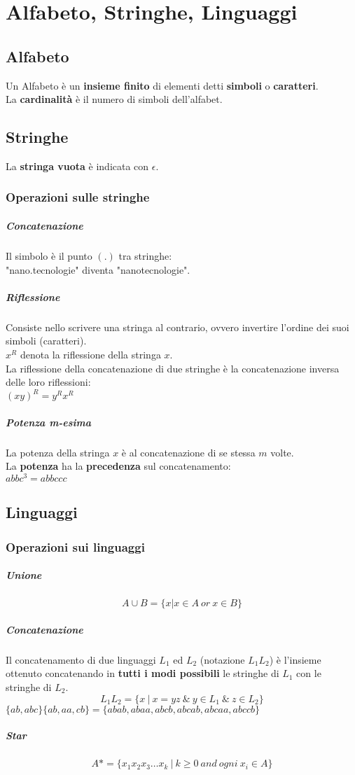 \documentclass[12pt]{extarticle}
\begin{document}
\section{Alfabeto, Stringhe, Linguaggi}
\subsection{Alfabeto}
Un Alfabeto è un \textbf{insieme finito} di elementi detti \textbf{simboli} o \textbf{caratteri}.\\
La \textbf{cardinalità} è il numero di simboli dell'alfabet.
\subsection{Stringhe}
La \textbf{stringa vuota} è indicata con $\epsilon$.
\subsubsection{Operazioni sulle stringhe}
\subparagraph{Concatenazione}
Il simbolo è il punto $(.)$ tra stringhe:\\
"nano.tecnologie" diventa "nanotecnologie".
\subparagraph{Riflessione}
Consiste nello scrivere una stringa al contrario, ovvero invertire l'ordine dei suoi simboli (caratteri).\\
$x^R$ denota la riflessione della stringa $x$.\\
La riflessione della concatenazione di due stringhe è la concatenazione inversa delle loro riflessioni:\\
$(xy)^R=y^Rx^R$
\subparagraph{Potenza m-esima}
La potenza della stringa $x$ è al concatenazione di se stessa $m$ volte.\\
La \textbf{potenza} ha la \textbf{precedenza} sul concatenamento:\\
$abbc^3 = abbccc$
\subsection{Linguaggi}
\subsubsection{Operazioni sui linguaggi}
\subparagraph{Unione}
\begin{equation*}
    A\cup B = \{x|x\in A\ or\ x\in B\}
\end{equation*}
\subparagraph{Concatenazione}
Il concatenamento di due linguaggi $L_1$ ed $L_2$ (notazione $L_1L_2$) è l'insieme ottenuto
concatenando in \textbf{tutti i modi possibili} le stringhe di $L_1$ con le stringhe di $L_2$.
\begin{equation*}
    L_1L_2=\{x\ |\ x=yz\ \&\ y \in L_1\ \&\ z \in L_2\}
\end{equation*}
$\{ab,abc\}\{ab,aa,cb\}=\{abab,abaa,abcb,abcab,abcaa,abccb\}$
\subparagraph{Star}
\begin{equation*}
    A*=\{x_1x_2x_3\dots x_k\ |\ k\geq 0\ and\ ogni\ x_i \in A\}
\end{equation*}
\newpage
\end{document}
